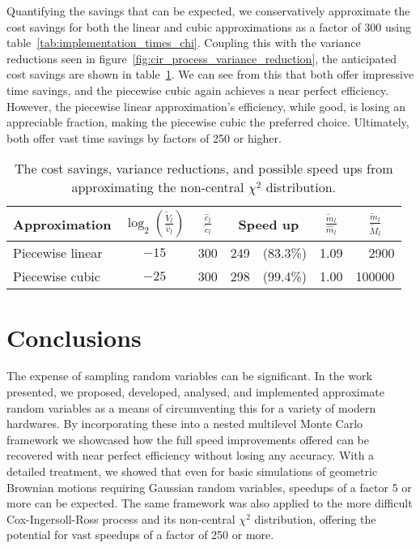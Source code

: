 \documentclass[9pt,a4paper,english]{extarticle}
\begin{document}
Quantifying the savings that can be expected, we conservatively approximate the cost savings for both the linear and cubic approximations as a factor of 300 using table~\ref{tab:implementation_times_chi}. Coupling this with the variance reductions seen in figure~\ref{fig:cir_process_variance_reduction}, the anticipated cost savings are shown in table~\ref{tab:savings_chi}. We can see from this that both offer impressive time savings, and the piecewise cubic again achieves a near perfect efficiency. However, the piecewise linear approximation's efficiency, while good, is losing an appreciable fraction, making the piecewise cubic the preferred choice. Ultimately, both offer vast time savings by factors of 250 or higher.

\begin{table}[htb]
\centering
\caption{The cost savings, variance reductions, and possible speed ups from approximating the non-central $ \chi^2 $ distribution.}
\label{tab:savings_chi}
\begin{tabular}{lcclrcr}
Approximation  & $ {\log}_2 \left(\tfrac{\widetilde{V}_l}{\hat{v}_l}\right) $ & $ \tfrac{\hat{c}_l}{\tilde{c}_l} $ & \multicolumn{2}{c}{Speed up} & $ \tfrac{\widetilde{m}_l}{\widehat{m}_l} $ & \multicolumn{1}{c}{$ \tfrac{\widetilde{m}_l}{\widetilde{M}_l} $} \\[0.5em]
\hline
Piecewise linear  & $ -15 $ & 300 & 249 & (83.3\%) & 1.09 & 2900 \\
Piecewise cubic  & $ -25 $ & 300 & 298 & (99.4\%)& 1.00 & 100000  
\end{tabular}
\end{table}


\section{Conclusions}
\label{sec:conclusions}

The expense of sampling random variables can be significant. In the work presented, we proposed, developed, analysed, and implemented approximate random variables as a means of circumventing this for a variety of modern hardwares. By incorporating these into a nested multilevel Monte Carlo framework we showcased how the full speed improvements offered can be recovered with near perfect efficiency without losing any accuracy. With a detailed treatment, we showed that even for basic simulations of geometric Brownian motions requiring Gaussian random variables, speedups of a factor 5 or more can be expected. The same framework was also applied to the more difficult Cox-Ingersoll-Ross process and its non-central $ \chi^2 $ distribution, offering the potential for vast speedups of a factor of 250 or more. 
\end{document}
